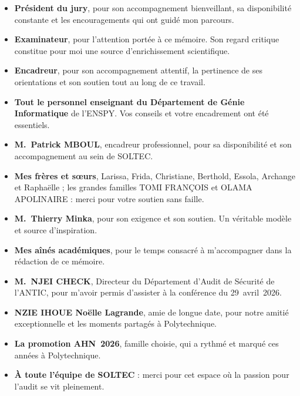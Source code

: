 \documentclass[12pt,a4paper,oneside]{report}
\begin{document}
\begin{itemize}[leftmargin=*, label={\color{gold}}, itemsep=6pt]
\item \textbf{Pr\'esident du jury}, pour son accompagnement bienveillant, sa
  disponibilit\'e constante et les encouragements qui ont guid\'e mon parcours.

\item \textbf{Examinateur}, pour l'attention port\'ee \`a ce m\'emoire. Son
  regard critique constitue pour moi une source d'enrichissement scientifique.

\item \textbf{Encadreur}, pour son accompagnement attentif, la pertinence de ses
  orientations et son soutien tout au long de ce travail.

\item \textbf{Tout le personnel enseignant du D\'epartement de G\'enie Informatique}
  de l'ENSPY. Vos conseils et votre encadrement ont \'et\'e essentiels.

\item \textbf{M.~Patrick MBOUL}, encadreur professionnel, pour sa disponibilit\'e
  et son accompagnement au sein de SOLTEC.

\item \textbf{Mes fr\`eres et s{\oe}urs}, Larissa, Frida, Christiane, Berthold,
  Essola, Archange et Rapha\"elle ; les grandes familles TOMI FRAN\c{C}OIS et
  OLAMA APOLINAIRE : merci pour votre soutien sans faille.

\item \textbf{M.~Thierry Minka}, pour son exigence et son soutien. Un v\'eritable
  mod\`ele et source d'inspiration.

\item \textbf{Mes a\^in\'es acad\'emiques}, pour le temps consacr\'e \`a
  m'accompagner dans la r\'edaction de ce m\'emoire.

\item \textbf{M.~NJEI CHECK}, Directeur du D\'epartement d'Audit de S\'ecurit\'e
  de l'ANTIC, pour m'avoir permis d'assister \`a la conf\'erence du 29~avril~2026.

\item \textbf{NZIE IHOUE No\"elle Lagrande}, amie de longue date, pour notre
  amiti\'e exceptionnelle et les moments partag\'es \`a Polytechnique.

\item \textbf{La promotion AHN~2026}, famille choisie, qui a rythm\'e et marqu\'e
  ces ann\'ees \`a Polytechnique.

\item \textbf{\`A toute l'\'equipe de SOLTEC} : merci pour cet espace o\`u
  la passion pour l'audit se vit pleinement.
\end{itemize}
\end{document}
